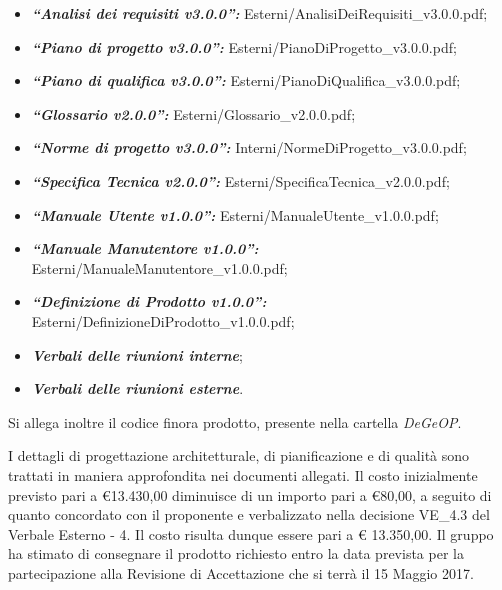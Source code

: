 \documentclass[a4paper,12pt]{letteracdp}
\begin{document}
\begin{letter}
	\begin{itemize}
        \item \textit{\textbf{“Analisi dei requisiti v3.0.0”:}} Esterni/AnalisiDeiRequisiti\_v3.0.0.pdf;
		\item \textit{\textbf{“Piano di progetto v3.0.0”:}} Esterni/PianoDiProgetto\_v3.0.0.pdf;
		\item \textit{\textbf{“Piano di qualifica v3.0.0”:}} Esterni/PianoDiQualifica\_v3.0.0.pdf;
		\item \textit{\textbf{“Glossario v2.0.0”:}} Esterni/Glossario\_v2.0.0.pdf;
		\item \textit{\textbf{“Norme di progetto v3.0.0”:}} Interni/NormeDiProgetto\_v3.0.0.pdf;
		\item \textit{\textbf{“Specifica Tecnica v2.0.0”:}} Esterni/SpecificaTecnica\_v2.0.0.pdf;
		\item \textit{\textbf{“Manuale Utente v1.0.0”:}} Esterni/ManualeUtente\_v1.0.0.pdf;
		\item \textit{\textbf{“Manuale Manutentore v1.0.0”:}} Esterni/ManualeManutentore\_v1.0.0.pdf;
		\item \textit{\textbf{“Definizione di Prodotto v1.0.0”:}} Esterni/DefinizioneDiProdotto\_v1.0.0.pdf;
		\item \textit{\textbf{Verbali delle riunioni interne}};
		\item \textit{\textbf{Verbali delle riunioni esterne}}.
	\end{itemize}
	Si allega inoltre il codice finora prodotto, presente nella cartella \textit{DeGeOP}.

	\noindent
I dettagli di progettazione architetturale, di pianificazione e di qualità sono trattati in maniera approfondita nei documenti allegati. Il costo inizialmente previsto pari a \euro 13.430,00 diminuisce di un importo pari a \euro 80,00, a seguito di quanto concordato con il proponente e verbalizzato nella decisione VE\_4.3 del Verbale Esterno - 4. Il costo risulta dunque essere pari a \euro{} 13.350,00.
Il gruppo ha stimato di consegnare il prodotto richiesto entro la data prevista per la partecipazione alla Revisione di Accettazione che si terrà il 15 Maggio 2017.


\end{letter}
\end{document}

